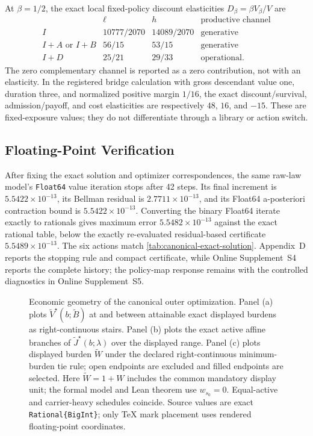 At \(\beta=1/2\), the exact local fixed-policy discount elasticities
\(D_\beta=\beta V_\beta/V\) are
\[
\begin{array}{c|cc|l}
 &\ell&h&\text{productive channel}\\ \hline
I&10777/2070&14089/2070&\text{generative}\\
I{+}A\text{ or }I{+}B&56/15&53/15&\text{generative}\\
I{+}D&25/21&29/33&\text{operational}.
\end{array}
\]
The zero complementary channel is reported as a zero contribution, not with
an elasticity.  In the registered bridge calculation with gross descendant
value one, duration three, and normalized positive margin \(1/16\), the exact
discount/survival, admission/payoff, and cost elasticities are respectively
\(48\), \(16\), and \(-15\).  These are fixed-exposure values; they do not
differentiate through a library or action switch.

\subsection{Floating-Point Verification}

After fixing the exact solution and optimizer correspondences, the same
raw-law model's \texttt{Float64} value iteration stops after 42 steps.  Its
final increment is \(5.5422\times10^{-13}\), its Bellman residual is
\(2.7711\times10^{-13}\), and its Float64 a-posteriori contraction bound is
\(5.5422\times10^{-13}\).  Converting the binary Float64 iterate exactly to
rationals gives maximum error \(5.5482\times10^{-13}\) against the exact
rational table, below the exactly re-evaluated residual-based certificate
\(5.5489\times10^{-13}\).  The six actions match
\cref{tab:canonical-exact-solution}.  Appendix~D reports the stopping rule and
compact certificate, while Online Supplement~S4 reports the complete history;
the policy-map response remains with the controlled diagnostics in
Online Supplement~S5.

\begin{figure}[p]
  \centering
  
  \caption{Economic geometry of the canonical outer optimization.  Panel
  (a) plots \(\widetilde V^\star(b;\widetilde B)\) at and between attainable
  exact displayed burdens as right-continuous stairs.  Panel (b) plots the
  exact active affine branches of \(\widetilde J^\star(b;\lambda)\) over the
  displayed range.  Panel (c) plots displayed burden \(\widetilde W\) under
  the declared right-continuous minimum-burden tie rule; open endpoints are
  excluded and filled endpoints are selected.  Here
  \(\widetilde W=1+W\) includes the common mandatory display unit; the formal
  model and Lean theorem use \(w_{s_0}=0\).  Equal-active and carrier-heavy
  schedules coincide.  Source values are exact
  \texttt{Rational\{BigInt\}}; only TeX mark placement uses rendered
  floating-point coordinates.}
  \label{fig:canonical-economic-geometry}
\end{figure}

\clearpage
